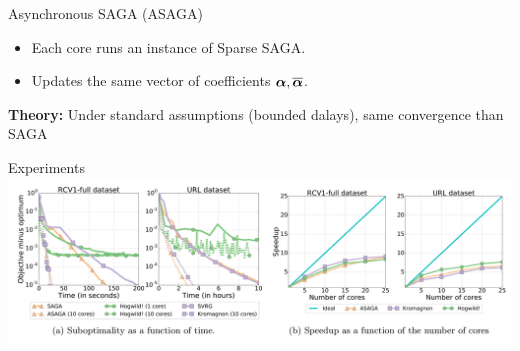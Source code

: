 \documentclass[10pt]{beamer}
\begin{document}
\begin{frame}{Asynchronous SAGA (ASAGA)}

\begin{itemize}
\item Each core runs an instance of Sparse SAGA.

\item Updates the same vector of coefficients ${\boldsymbol \alpha}, \overline{{\boldsymbol \alpha}}$.
\end{itemize}


{\bfseries Theory:} Under standard assumptions (bounded dalays), same convergence than SAGA

\end{frame}

\begin{frame}{Experiments}
\includegraphics[width=\linewidth]{img/results_asaga}

\begin{itemize}
\end{itemize}

\end{frame}
\end{document}
